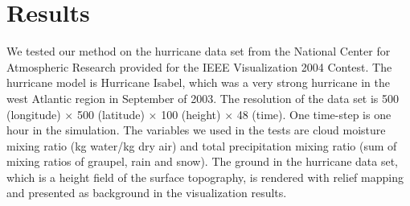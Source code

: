 


\section{Results}
We tested our method on the hurricane data set from the National Center for Atmospheric Research provided for the IEEE Visualization 2004 Contest.
The hurricane model is Hurricane Isabel, which was a very strong hurricane in the west Atlantic region in September of 2003.
The resolution of the data set is 500 (longitude) $ \times $ 500 (latitude) $ \times $ 100 (height) $ \times $ 48 (time). One time-step is one hour in the simulation.
The variables we used in the tests are cloud moisture mixing ratio (kg water/kg dry air) and total precipitation mixing ratio (sum of mixing ratios of graupel, rain and snow). The ground in the hurricane data set, which is a height field of the surface topography, is rendered with relief mapping and presented as background in the visualization results.

